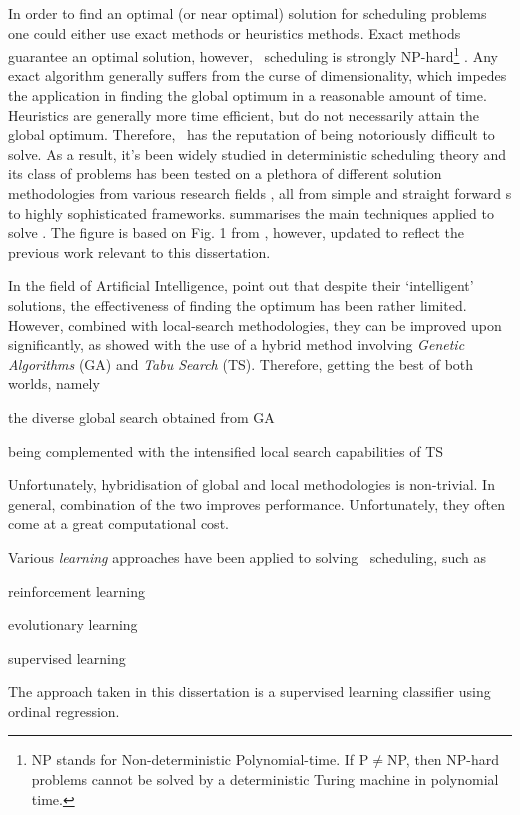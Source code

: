 In order to find an optimal (or near optimal) solution for scheduling problems 
one could either use exact methods or heuristics methods. Exact methods 
guarantee an optimal solution, however, \jsp\ scheduling is strongly 
NP-hard\footnote{NP stands for Non-deterministic Polynomial-time.
    If P$\neq$NP, then NP-hard problems cannot be solved by a deterministic 
    Turing machine in polynomial time.}
\citep{Garey76:NPhard}. Any exact algorithm generally suffers from the curse of 
dimensionality, which impedes the application in finding the global optimum in 
a reasonable amount of time. Heuristics are generally more time efficient, but 
do not necessarily attain the global optimum. Therefore, \JSP\ has the 
reputation of being notoriously difficult to solve. As a result, it's 
been widely studied in deterministic scheduling theory and its class of 
problems has been tested on a plethora of different solution methodologies from 
various research fields \citep{Meeran12}, all from simple and straight forward 
\dr s to highly sophisticated frameworks.
 summarises the main techniques applied to solve \JSP. The 
figure is based on Fig. 1 from \citet{Jain99}, however, updated to reflect the 
previous work relevant to this dissertation.


In the field of Artificial Intelligence, \cite{Meeran12} point out that despite 
their `intelligent' solutions, the effectiveness of finding the optimum has 
been rather limited. However, combined with local-search methodologies, they 
can be improved upon significantly, as \citeauthor{Meeran12} showed with the 
use of a hybrid method involving \emph{Genetic Algorithms} (GA) and \emph{Tabu 
Search} (TS). 
Therefore, getting the best of both worlds, namely
\begin{enumerate*}[label={{}}]
  \item the diverse global search obtained from GA 
  \item being complemented with the intensified local search capabilities of TS
\end{enumerate*}
Unfortunately, hybridisation of global and local methodologies is non-trivial. 
In general, combination of the two improves performance. Unfortunately, they 
often come at a great computational cost.  

Various \emph{learning} approaches have been applied to solving \jsp\ 
scheduling, such as
\begin{enumerate*}
  \item reinforcement learning \citep{Zhang95}
  \item evolutionary learning \citep{Tay08}
  \item supervised learning \citep{Siggi05,Malik08}
\end{enumerate*}
The approach taken in this 
dissertation is a supervised learning classifier using ordinal regression. 

